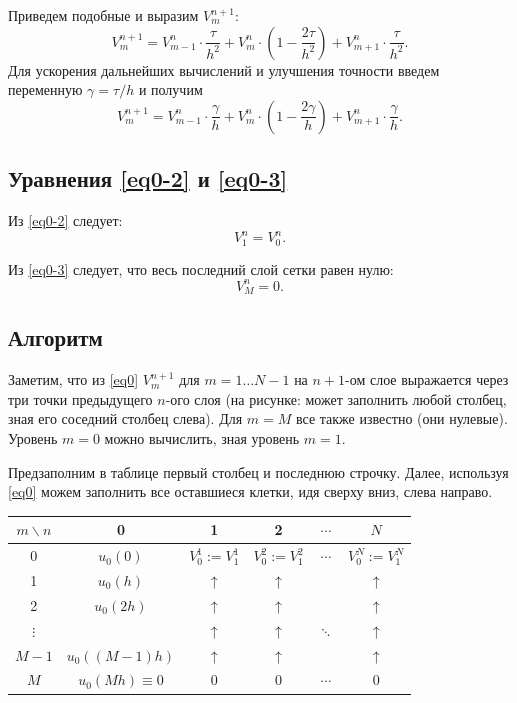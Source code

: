 \documentclass[12pt]{extarticle}
\numberwithin{equation}{section}
\begin{document}
Приведем подобные и выразим $V_m^{n+1}$:
$$V_m^{n+1} = V_{m-1}^n \cdot \frac{\tau}{h^2}  + V_m^n \cdot \left( 1 - \frac{2 \tau}{h^2} \right) + V_{m+1}^n \cdot \frac{\tau}{h^2}.$$
Для ускорения дальнейших вычислений и улучшения точности введем переменную $\gamma = \tau/h$ и получим 
\begin{equation}
V_m^{n+1} = V_{m-1}^n \cdot \frac{\gamma}{h}  + V_m^n \cdot \left( 1 - \frac{2 \gamma}{h} \right) + V_{m+1}^n \cdot \frac{\gamma}{h}. \label{eq0}
\end{equation}

\subsection{Уравнения \ref{eq0-2} и \ref{eq0-3}}
Из \ref{eq0-2} следует: $$V_{1}^{n} = V_0^{n}.$$

Из \ref{eq0-3} следует, что весь последний слой сетки равен нулю: $$V_M^n = 0.$$

\subsection{Алгоритм}
Заметим, что  из \ref{eq0} $V_m^{n+1}$ для $m = 1 \dots N - 1$ на $n+1$-ом слое выражается через три точки предыдущего $n$-ого слоя (на рисунке: может заполнить любой столбец, зная его соседний столбец слева).
Для $m = M$ все также известно (они нулевые).
Уровень $m = 0$ можно вычислить, зная уровень $m = 1$.

Предзаполним в таблице первый столбец и последнюю строчку.
Далее, используя \ref{eq0} можем заполнить все оставшиеся клетки, идя сверху вниз, слева направо.
\begin{center}
\begin{tabular}{|c||c|c|c|c|c|}
\hline
$m \backslash n$ & 0 & 1 & 2 & $\cdots$ & $N$ \\
\hline
\hline
0			& $u_0 (0)$ & $V_0^1 := V_1^1$ &$V_0^2:=V_1^2$ &  $\cdots$ & $V_0^N:=V_1^N$ \\
\hline                                                 
1			& $u_0 (h)$		 & $\uparrow$ & $\uparrow$ &  &$\uparrow$ \\
\hline                                                 
2			& $u_0 (2h)$	 & $\uparrow$ & $\uparrow$ &  & $\uparrow$\\
\hline                                                 
$\vdots$ 	&  				 & $\uparrow$ & $\uparrow$ & $\ddots$ & $\uparrow$\\
\hline                                                 
$M - 1$ 	& $u_0 ((M-1)h)$ & $\uparrow$ & $\uparrow$ &  & $\uparrow$\\
\hline
$M$			& $u_0 (Mh) \equiv 0$ & $0$ & $0$ & $\cdots$  & $0$ \\
\hline
\end{tabular}
\end{center}
\end{document}
